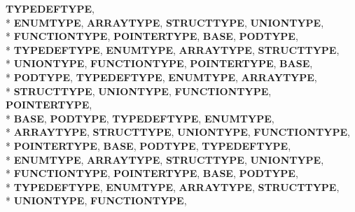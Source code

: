 \begin{DoxyCompactItemize}
{\bfseries T\-Y\-P\-E\-D\-E\-F\-T\-Y\-P\-E}, 
\\*
{\bfseries E\-N\-U\-M\-T\-Y\-P\-E}, 
{\bfseries A\-R\-R\-A\-Y\-T\-Y\-P\-E}, 
{\bfseries S\-T\-R\-U\-C\-T\-T\-Y\-P\-E}, 
{\bfseries U\-N\-I\-O\-N\-T\-Y\-P\-E}, 
\\*
{\bfseries F\-U\-N\-C\-T\-I\-O\-N\-T\-Y\-P\-E}, 
{\bfseries P\-O\-I\-N\-T\-E\-R\-T\-Y\-P\-E}, 
{\bfseries B\-A\-S\-E}, 
{\bfseries P\-O\-D\-T\-Y\-P\-E}, 
\\*
{\bfseries T\-Y\-P\-E\-D\-E\-F\-T\-Y\-P\-E}, 
{\bfseries E\-N\-U\-M\-T\-Y\-P\-E}, 
{\bfseries A\-R\-R\-A\-Y\-T\-Y\-P\-E}, 
{\bfseries S\-T\-R\-U\-C\-T\-T\-Y\-P\-E}, 
\\*
{\bfseries U\-N\-I\-O\-N\-T\-Y\-P\-E}, 
{\bfseries F\-U\-N\-C\-T\-I\-O\-N\-T\-Y\-P\-E}, 
{\bfseries P\-O\-I\-N\-T\-E\-R\-T\-Y\-P\-E}, 
{\bfseries B\-A\-S\-E}, 
\\*
{\bfseries P\-O\-D\-T\-Y\-P\-E}, 
{\bfseries T\-Y\-P\-E\-D\-E\-F\-T\-Y\-P\-E}, 
{\bfseries E\-N\-U\-M\-T\-Y\-P\-E}, 
{\bfseries A\-R\-R\-A\-Y\-T\-Y\-P\-E}, 
\\*
{\bfseries S\-T\-R\-U\-C\-T\-T\-Y\-P\-E}, 
{\bfseries U\-N\-I\-O\-N\-T\-Y\-P\-E}, 
{\bfseries F\-U\-N\-C\-T\-I\-O\-N\-T\-Y\-P\-E}, 
{\bfseries P\-O\-I\-N\-T\-E\-R\-T\-Y\-P\-E}, 
\\*
{\bfseries B\-A\-S\-E}, 
{\bfseries P\-O\-D\-T\-Y\-P\-E}, 
{\bfseries T\-Y\-P\-E\-D\-E\-F\-T\-Y\-P\-E}, 
{\bfseries E\-N\-U\-M\-T\-Y\-P\-E}, 
\\*
{\bfseries A\-R\-R\-A\-Y\-T\-Y\-P\-E}, 
{\bfseries S\-T\-R\-U\-C\-T\-T\-Y\-P\-E}, 
{\bfseries U\-N\-I\-O\-N\-T\-Y\-P\-E}, 
{\bfseries F\-U\-N\-C\-T\-I\-O\-N\-T\-Y\-P\-E}, 
\\*
{\bfseries P\-O\-I\-N\-T\-E\-R\-T\-Y\-P\-E}, 
{\bfseries B\-A\-S\-E}, 
{\bfseries P\-O\-D\-T\-Y\-P\-E}, 
{\bfseries T\-Y\-P\-E\-D\-E\-F\-T\-Y\-P\-E}, 
\\*
{\bfseries E\-N\-U\-M\-T\-Y\-P\-E}, 
{\bfseries A\-R\-R\-A\-Y\-T\-Y\-P\-E}, 
{\bfseries S\-T\-R\-U\-C\-T\-T\-Y\-P\-E}, 
{\bfseries U\-N\-I\-O\-N\-T\-Y\-P\-E}, 
\\*
{\bfseries F\-U\-N\-C\-T\-I\-O\-N\-T\-Y\-P\-E}, 
{\bfseries P\-O\-I\-N\-T\-E\-R\-T\-Y\-P\-E}, 
{\bfseries B\-A\-S\-E}, 
{\bfseries P\-O\-D\-T\-Y\-P\-E}, 
\\*
{\bfseries T\-Y\-P\-E\-D\-E\-F\-T\-Y\-P\-E}, 
{\bfseries E\-N\-U\-M\-T\-Y\-P\-E}, 
{\bfseries A\-R\-R\-A\-Y\-T\-Y\-P\-E}, 
{\bfseries S\-T\-R\-U\-C\-T\-T\-Y\-P\-E}, 
\\*
{\bfseries U\-N\-I\-O\-N\-T\-Y\-P\-E}, 
{\bfseries F\-U\-N\-C\-T\-I\-O\-N\-T\-Y\-P\-E}, 

\end{DoxyCompactItemize}
